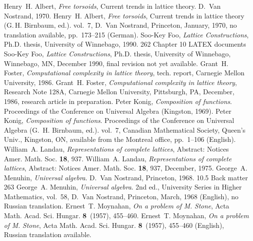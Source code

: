 \documentclass[a4paper,12pt]{article}
\begin{document}
\begin{thebibliography}{99}
Henry~H. Albert,
\emph{Free torsoids},
Current trends in lattice theory.
D.~Van Nostrand, 1970.
Henry~H. Albert,
\emph{Free torsoids},
Current trends in lattice theory
(G.\,H. Birnbaum, ed.).
vol.~7, D.~Van Nostrand, Princeton, January, 1970,
no translation available, pp.~173--215 (German).
Soo-Key Foo,
\emph{Lattice Constructions},
Ph.D. thesis, University of Winnebago, 1990.
262
Chapter 10 LATEX documents
Soo-Key Foo,
\emph{Lattice Constructions},
Ph.D. thesis, University of Winnebago, Winnebago, MN,
December 1990, final revision not yet available.
Grant~H. Foster,
\emph{Computational complexity in lattice theory},
tech. report, Carnegie Mellon University, 1986.
Grant~H. Foster,
\emph{Computational complexity in lattice theory},
Research Note 128A, Carnegie Mellon University,
Pittsburgh, PA, December, 1986,
research article in preparation.
Peter Konig,
\emph{Composition of functions}.
Proceedings of the Conference on Universal Algebra
(Kingston, 1969).
Peter Konig,
\emph{Composition of functions}.
Proceedings of the Conference on Universal Algebra
(G.~H. Birnbaum, ed.).
vol.~7, Canadian Mathematical Society,
Queen’s Univ., Kingston, ON,
available from the Montreal office,
pp.~1--106 (English).
William~A. Landau,
\emph{Representations of complete lattices},
Abstract: Notices Amer. Math. Soc. \textbf{18}, 937.
William~A. Landau,
\emph{Representations of complete lattices},
Abstract: Notices Amer. Math. Soc. \textbf{18}, 937,
December, 1975.
George~A. Menuhin,
\emph{Universal algebra}.
D.~Van Nostrand, Princeton, 1968.
10.5 Back matter
263
George~A. Menuhin,
\emph{Universal algebra}. 2nd ed.,
University Series in Higher Mathematics, vol.~58,
D.~Van Nostrand, Princeton,
March, 1968 (English), no Russian translation.
Ernest~T. Moynahan,
\emph{On a problem of M. Stone},
Acta Math. Acad. Sci. Hungar.
\textbf{8}~(1957), 455--460.
Ernest~T. Moynahan,
\emph{On a problem of M. Stone},
Acta Math. Acad. Sci. Hungar.
\textbf{8}~(1957), 455--460
(English), Russian translation available.
\end{thebibliography}
\end{document}
